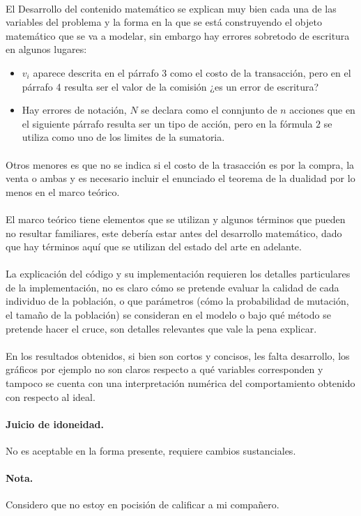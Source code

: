\documentclass{article}
\begin{document}
\paragraph{} El Desarrollo del contenido matemático se explican muy bien cada una de las variables del problema y la forma en la que se está construyendo el objeto matemático que se va a modelar, sin embargo hay errores sobretodo de escritura en algunos lugares:
\begin{itemize}
	\item $v_i$ aparece descrita en el párrafo 3 como el costo de la transacción, pero en el párrafo 4 resulta ser el valor de la comisión ¿es un error de escritura?
	\item Hay errores de notación, $N$ se declara como el connjunto de $n$ acciones que en el siguiente párrafo resulta ser un tipo de acción, pero en la fórmula $2$ se utiliza como uno de los limites de la sumatoria.
\end{itemize}
\paragraph{} Otros menores es que no se indica si el costo de la trasacción es por la compra, la venta o ambas y es necesario incluir el enunciado el teorema de la dualidad por lo menos en el marco teórico.
\paragraph{}El marco teórico tiene elementos que se utilizan y algunos términos que pueden no resultar familiares, este debería estar antes del desarrollo matemático, dado que hay términos aquí que se utilizan del estado del arte en adelante.
\paragraph{}La explicación del código y su implementación requieren los detalles particulares de la implementación, no es claro cómo se pretende evaluar la calidad de cada individuo de la población, o que parámetros (cómo la probabilidad de mutación, el tamaño de la población) se consideran en el modelo o bajo qué método se pretende hacer el cruce, son detalles relevantes que vale la pena explicar.
\paragraph{}En los resultados obtenidos, si bien son cortos y concisos, les falta desarrollo, los gráficos por ejemplo no son claros respecto a qué variables corresponden y tampoco se cuenta con una interpretación numérica del comportamiento obtenido con respecto al ideal.
\paragraph{Juicio de idoneidad.} No es aceptable en la forma presente, requiere cambios sustanciales.

\paragraph{Nota.}Considero que no estoy en pocisión de calificar a mi compañero. 
\end{document}
